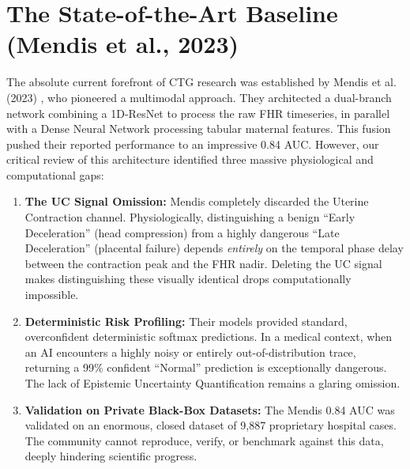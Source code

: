 \documentclass[12pt,a4paper]{report}
\begin{document}
\section{The State-of-the-Art Baseline (Mendis et al., 2023)}
The absolute current forefront of CTG research was established by Mendis et al. (2023) \cite{mendis}, who pioneered a multimodal approach. They architected a dual-branch network combining a 1D-ResNet to process the raw FHR timeseries, in parallel with a Dense Neural Network processing tabular maternal features. This fusion pushed their reported performance to an impressive 0.84 AUC. However, our critical review of this architecture identified three massive physiological and computational gaps:
\begin{enumerate}
    \item \textbf{The UC Signal Omission:} Mendis completely discarded the Uterine Contraction channel. Physiologically, distinguishing a benign ``Early Deceleration'' (head compression) from a highly dangerous ``Late Deceleration'' (placental failure) depends \textit{entirely} on the temporal phase delay between the contraction peak and the FHR nadir. Deleting the UC signal makes distinguishing these visually identical drops computationally impossible.
    \item \textbf{Deterministic Risk Profiling:} Their models provided standard, overconfident deterministic softmax predictions. In a medical context, when an AI encounters a highly noisy or entirely out-of-distribution trace, returning a 99\% confident ``Normal'' prediction is exceptionally dangerous. The lack of Epistemic Uncertainty Quantification remains a glaring omission.
    \item \textbf{Validation on Private Black-Box Datasets:} The Mendis 0.84 AUC was validated on an enormous, closed dataset of 9,887 proprietary hospital cases. The community cannot reproduce, verify, or benchmark against this data, deeply hindering scientific progress.
\end{enumerate}
\end{document}
